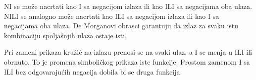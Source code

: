 
NI se može nacrtati kao I sa negacijom izlaza ili kao ILI sa negacijama oba ulaza. NILI se analogno može nacrtati kao ILI sa negacijom izlaza ili kao I sa negacijama oba ulaza. De Morganovi obrasci garantuju da izlaz za svaku istu kombinaciju spoljašnjih ulaza ostaje isti.

Pri zameni prikaza kružić na izlazu prenosi se na svaki ulaz, a I se menja u ILI ili obrnuto. To je promena simboličkog prikaza iste funkcije. Prostom zamenom I sa ILI bez odgovarajućih negacija dobila bi se druga funkcija.
